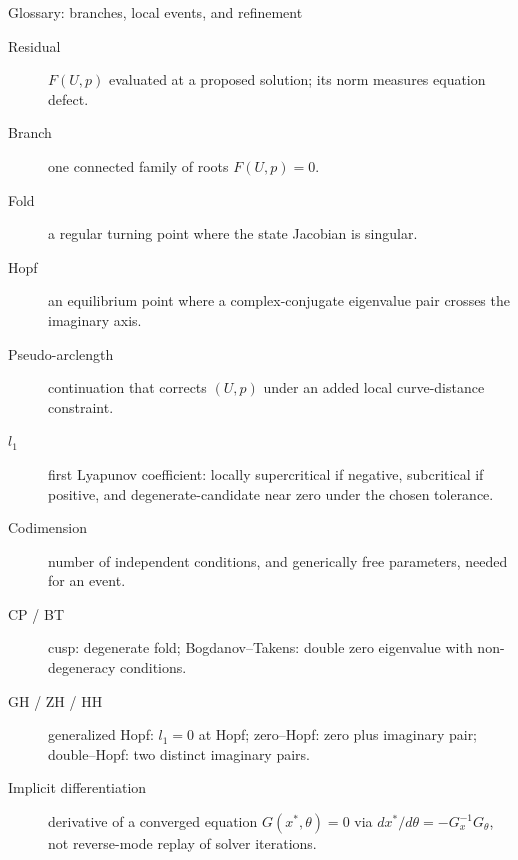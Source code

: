 \begin{frame}{Glossary: branches, local events, and refinement}
\scriptsize
\begin{description}
  \item[Residual] $F(U,p)$ evaluated at a proposed solution; its norm measures equation defect.
  \item[Branch] one connected family of roots $F(U,p)=0$.
  \item[Fold] a regular turning point where the state Jacobian is singular.
  \item[Hopf] an equilibrium point where a complex-conjugate eigenvalue pair crosses the imaginary axis.
  \item[Pseudo-arclength] continuation that corrects $(U,p)$ under an added local curve-distance constraint.
  \item[$l_1$] first Lyapunov coefficient: locally supercritical if negative,
        subcritical if positive, and degenerate-candidate near zero under the chosen tolerance.
  \item[Codimension] number of independent conditions, and generically free parameters, needed for an event.
  \item[CP / BT] cusp: degenerate fold; Bogdanov--Takens: double zero eigenvalue with non-degeneracy conditions.
  \item[GH / ZH / HH] generalized Hopf: $l_1=0$ at Hopf; zero--Hopf: zero plus imaginary pair;
        double--Hopf: two distinct imaginary pairs.
  \item[Implicit differentiation] derivative of a converged equation $G(x^*,\theta)=0$ via
        $dx^*/d\theta=-G_x^{-1}G_\theta$, not reverse-mode replay of solver iterations.
\end{description}
\end{frame}

